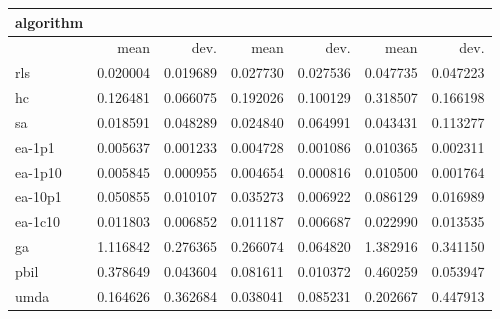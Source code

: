 \begin{tabular}{@{}l*{6}{>{{}}N{1}{2}}@{}}
\toprule
{algorithm} &  &  &  \\
\midrule
& {mean} & {dev.} & {mean} & {dev.} & {mean} & {dev.} \\
\midrule
rls & 0.020004 & 0.019689 & 0.027730 & 0.027536 & 0.047735 & 0.047223 \\
 hc & 0.126481 & 0.066075 & 0.192026 & 0.100129 & 0.318507 & 0.166198 \\
 sa & 0.018591 & 0.048289 & 0.024840 & 0.064991 & 0.043431 & 0.113277 \\
 ea-1p1 & 0.005637 & 0.001233 & 0.004728 & 0.001086 & 0.010365 & 0.002311 \\
 ea-1p10 & 0.005845 & 0.000955 & 0.004654 & 0.000816 & 0.010500 & 0.001764 \\
 ea-10p1 & 0.050855 & 0.010107 & 0.035273 & 0.006922 & 0.086129 & 0.016989 \\
 ea-1c10 & 0.011803 & 0.006852 & 0.011187 & 0.006687 & 0.022990 & 0.013535 \\
 ga & 1.116842 & 0.276365 & 0.266074 & 0.064820 & 1.382916 & 0.341150 \\
 pbil & 0.378649 & 0.043604 & 0.081611 & 0.010372 & 0.460259 & 0.053947 \\
 umda & 0.164626 & 0.362684 & 0.038041 & 0.085231 & 0.202667 & 0.447913 \\
 \bottomrule
\end{tabular}

